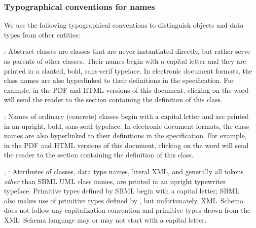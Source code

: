 


\subsubsection{Typographical conventions for names}
\label{sec:notation-typographical}

We use the following typographical conventions to distinguish
objects and data types from other entities:

\begin{description}
  
\item {}: Abstract classes are classes
  that are never instantiated directly, but rather serve as
  parents of other classes.  Their names begin with a capital
  letter and they are printed in a slanted, bold,
  sans-serif typeface.  In electronic document formats, the class
  names are also hyperlinked to their definitions in the
  specification.  For example, in the PDF and HTML versions of
  this document, clicking on the word \SBase will send the reader
  to the section containing the definition of this class.
  
\item {}: Names of ordinary (concrete) classes begin
  with a capital letter and are printed in an upright,
  bold, sans-serif typeface.  In electronic document
  formats, the class names are also hyperlinked to their
  definitions in the specification.  For example, in the PDF and
  HTML versions of this document, clicking on the word \Species
  will send the reader to the section containing the definition of
  this class.

\item {}, : Attributes of
  classes, data type names, literal XML, and generally all tokens
  \emph{other} than SBML UML class names, are printed in an
  upright typewriter typeface.  Primitive types defined by SBML
  begin with a capital letter; SBML also makes use of primitive
  types defined by \xmlschemaone, but unfortunately, XML~Schema
  does not follow any capitalization convention and primitive
  types drawn from the XML~Schema language may or may not start
  with a capital letter.

\end{description}



